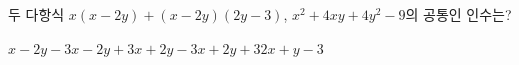 두 다항식 $x(x-2y)+(x-2y)(2y-3)$, $x^2+4xy+4y^2-9$의 공통인 인수는?
\begin{choicesii}{$x-2y-3$}{$x-2y+3$}{$x+2y-3$}{$x+2y+3$}{$2x+y-3$}\end{choicesii}
